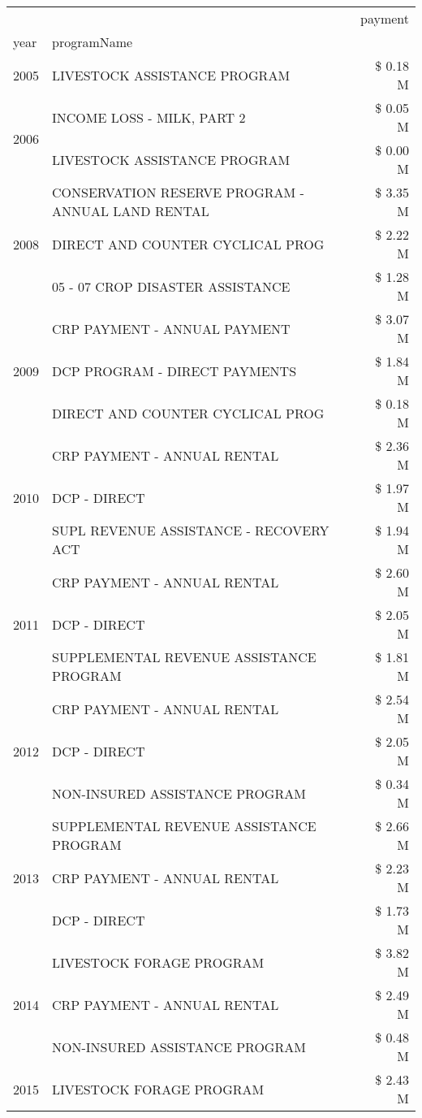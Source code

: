 \begin{tabular}{llr}
\toprule
 &  & payment \\
year & programName &  \\
\midrule
2005 & LIVESTOCK ASSISTANCE PROGRAM & \$ 0.18 M \\
\cline{1-3}
\multirow[t]{2}{*}{2006} & INCOME LOSS - MILK, PART 2 & \$ 0.05 M \\
 & LIVESTOCK ASSISTANCE PROGRAM & \$ 0.00 M \\
\cline{1-3}
\multirow[t]{3}{*}{2008} & CONSERVATION RESERVE PROGRAM - ANNUAL LAND RENTAL & \$ 3.35 M \\
 & DIRECT AND COUNTER CYCLICAL PROG & \$ 2.22 M \\
 & 05 - 07 CROP DISASTER ASSISTANCE & \$ 1.28 M \\
\cline{1-3}
\multirow[t]{3}{*}{2009} & CRP PAYMENT - ANNUAL PAYMENT & \$ 3.07 M \\
 & DCP PROGRAM - DIRECT PAYMENTS & \$ 1.84 M \\
 & DIRECT AND COUNTER CYCLICAL PROG & \$ 0.18 M \\
\cline{1-3}
\multirow[t]{3}{*}{2010} & CRP PAYMENT - ANNUAL RENTAL & \$ 2.36 M \\
 & DCP - DIRECT & \$ 1.97 M \\
 & SUPL REVENUE ASSISTANCE - RECOVERY ACT & \$ 1.94 M \\
\cline{1-3}
\multirow[t]{3}{*}{2011} & CRP PAYMENT - ANNUAL RENTAL & \$ 2.60 M \\
 & DCP - DIRECT & \$ 2.05 M \\
 & SUPPLEMENTAL REVENUE ASSISTANCE PROGRAM & \$ 1.81 M \\
\cline{1-3}
\multirow[t]{3}{*}{2012} & CRP PAYMENT - ANNUAL RENTAL & \$ 2.54 M \\
 & DCP - DIRECT & \$ 2.05 M \\
 & NON-INSURED ASSISTANCE PROGRAM & \$ 0.34 M \\
\cline{1-3}
\multirow[t]{3}{*}{2013} & SUPPLEMENTAL REVENUE ASSISTANCE PROGRAM & \$ 2.66 M \\
 & CRP PAYMENT - ANNUAL RENTAL & \$ 2.23 M \\
 & DCP - DIRECT & \$ 1.73 M \\
\cline{1-3}
\multirow[t]{3}{*}{2014} & LIVESTOCK FORAGE PROGRAM & \$ 3.82 M \\
 & CRP PAYMENT - ANNUAL RENTAL & \$ 2.49 M \\
 & NON-INSURED ASSISTANCE PROGRAM & \$ 0.48 M \\
\cline{1-3}
\multirow[t]{3}{*}{2015} & LIVESTOCK FORAGE PROGRAM & \$ 2.43 M \\

\end{tabular}
